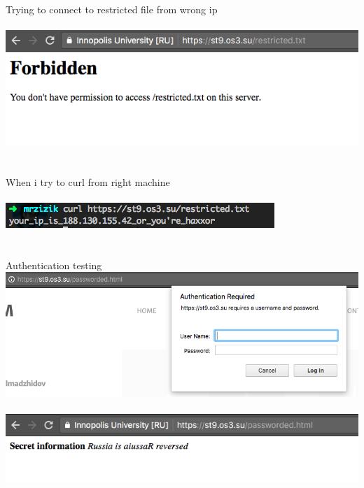 \documentclass[10pt]{article}
\begin{document}
Trying to connect to restricted file from wrong ip \\ \\
\includegraphics[width=\textwidth, scale=0.5]{forbidden} \\ \\ \\
When i try to curl from right machine \\ \\
\includegraphics[width=\textwidth, scale=0.5]{restricted} \\ \\ \\
Authentication testing \\
\includegraphics[width=\textwidth, scale=0.5]{auth} \\ \\

\includegraphics[width=\textwidth, scale=0.5]{auth2} \\ \\
\end{document}
